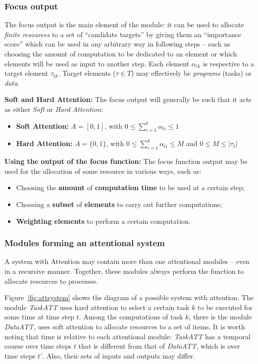 \documentclass[12pt]{article}
\begin{document}
\subsubsection{Focus output}
The focus output is the main element of the module: it can be used to allocate \emph{finite resources} to a set of ``candidate targets'' by giving them an ``importance score'' which can be used in any arbitrary way in following steps -- such as choosing the amount of computation to be dedicated to an element or which elements will be used as input to another step.
Each element $\alpha_{tk}$ is respective to a target element $\tau_{tk}$.
Target elements ($\tau \in T$) may effectively be \emph{programs} (tasks) or \emph{data}.

\textbf{Soft and Hard Attention:}
The focus output will generally be such that it acts as either \emph{Soft} or \emph{Hard Attention}:
\begin{itemize}
    \item \textbf{Soft Attention:}
        $A = [0, 1]$, with $0 \le \sum_{i=1}^{k} \alpha_{ti} \le 1$
    \item \textbf{Hard Attention:}
        $A = \{0, 1\}$, with $0 \le \sum_{i=1}^{k} \alpha_{ti} \le M$ and $0 \le M \le |\tau_t|$
\end{itemize}

\textbf{Using the output of the focus function:}
The focus function output may be used for the allocation of some resource in various ways, such as:
\begin{itemize}
    \item Choosing the \textbf{amount} of \textbf{computation time} to be used at a certain step;
    \item Choosing a \textbf{subset} of \textbf{elements} to carry out further computations;
    \item \textbf{Weighting elements} to perform a certain computation.
\end{itemize}

\subsubsection{Modules forming an attentional system}
A system with Attention may contain more than one attentional modules -- even in a recursive manner.
Together, these modules always perform the function to allocate resources to
processes.

Figure~\ref{fig:attsystem} shows the diagram of a possible system with attention.
The module \emph{TaskATT} uses hard attention to select a certain task $k$ to be executed for some time at time step $t$.
Among the computations of task $k$, there is the module \emph{DataATT}, uses soft attention to allocate resources to a set of items.
It is worth noting that time is relative to each attentional module: \emph{TaskATT} has a temporal course over time steps $t$ that is different from that of \emph{DataATT}, which is over time steps $t'$.
Also, their sets of inputs and outputs may differ.
\end{document}
